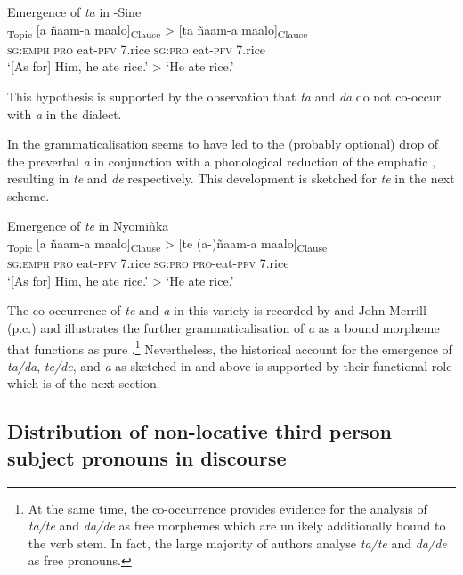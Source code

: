 \documentclass[output=paper
,newtxmath
,modfonts
,nonflat]{langsci/langscibook}
\begin{document}
\ea\label{ex:apel:14}
{Emergence of \textit{ta} in -Sine}\\
\gll   [ten]\textsubscript{Topic} [a ñaam-a maalo]\textsubscript{Clause} > [ta ñaam-a maalo]\textsubscript{Clause}\\
     \textsc{sg:emph} \textsc{pro} eat\textsc{-pfv} \textsc{7.}rice {} \textsc{sg:pro} eat\textsc{-pfv} \textsc{7.}rice\\
\glt ‘[As for] Him, he ate rice.’ > ‘He ate rice.’
\z

This hypothesis is supported by the observation that \textit{ta} and \textit{da} do not co-occur with \textit{a} in the  dialect.

In   the grammaticalisation seems to have led to the (probably optional) drop of the preverbal \textit{a} in conjunction with a phonological reduction of the emphatic , resulting in \textit{te} and \textit{de} respectively. This development is sketched for \textit{te} in the next scheme.

\ea\label{ex:apel:15}
{Emergence of \textit{te} in  Nyomiñka}\\
\gll   [ten]\textsubscript{Topic} [a ñaam-a maalo]\textsubscript{Clause} > [te (a-)ñaam-a maalo]\textsubscript{Clause}\\
     \textsc{sg:emph} \textsc{pro} eat\textsc{-pfv} \textsc{7.}rice {} \textsc{sg:pro} \textsc{pro-}eat\textsc{-pfv} \textsc{7.}rice\\
\glt ‘[As for] Him, he ate rice.’ > ‘He ate rice.’
\z

The co-occurrence of \textit{te} and \textit{a} in this variety is recorded by \citet{Renaudier2012} and John Merrill (p.c.) and illustrates the further grammaticalisation of \textit{a} as a bound morpheme that functions as pure .\footnote{At the same time, the co-occurrence provides evidence for the analysis of \textit{ta/te} and \textit{da/de} as free morphemes which are unlikely additionally bound to the verb stem. In fact, the large majority of authors analyse \textit{ta/te} and \textit{da/de} as free pronouns.} Nevertheless, the historical account for the emergence of \textit{ta/da}, \textit{te/de}, and \textit{a} as sketched in  and  above is supported by their functional role which is  of the next section. 

\subsection{Distribution of non-locative third person subject pronouns in discourse}\label{sec:apel:2.3}
\end{document}
